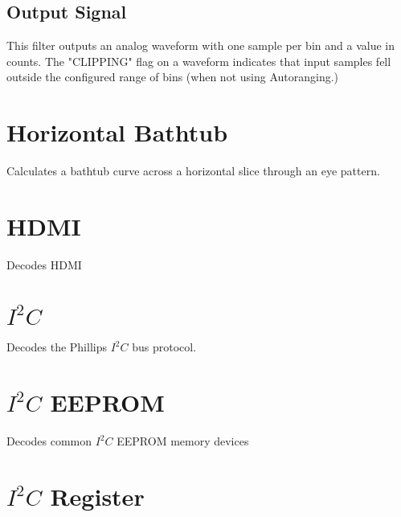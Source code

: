 \subsection{Output Signal}

This filter outputs an analog waveform with one sample per bin and a value in counts. The "CLIPPING" flag on a waveform
indicates that input samples fell outside the configured range of bins (when not using Autoranging.)

\pagebreak
\section{Horizontal Bathtub}

Calculates a bathtub curve across a horizontal slice through an eye pattern.

\pagebreak
\section{HDMI}
\label{filter:hdmi}

Decodes HDMI

\pagebreak
\section{$I^2C$}

Decodes the Phillips $I^2C$ bus protocol.

\pagebreak
\section{$I^2C$ EEPROM}

Decodes common $I^2C$ EEPROM memory devices

\pagebreak
\section{$I^2C$ Register}

